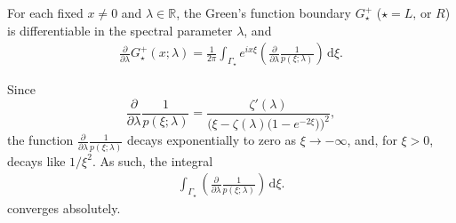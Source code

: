 \documentclass[../dissertation]{subfiles}
\begin{document}
\begin{prop}\label{prop2:ldervG}
	For each fixed $x\ne 0$ and $\lambda \in \mathbb R$, the Green's function 
	boundary $G_\star^+$ ($\star = L \text{, or } R$) is dif{}ferentiable in 
	the spectral parameter $\lambda$, and 
	\begin{align*}
		\frac{\partial}{\partial \lambda} G_\star^+(x; \lambda)
			= \frac{1}{2\pi} 
				\int_{{\Gamma_\star}} e^{ix\xi} 
					\left(
						\frac{\partial}{\partial \lambda} \frac{1}{p(\xi; \lambda)}
					\right)
				\, \mathrm{d}\xi.
	\end{align*}
\end{prop}
\begin{rmk}
	Since
	\[
		\frac{\partial}{\partial \lambda} \frac{1}{p(\xi; \lambda)}
			= 
				\frac{\zeta'(\lambda)}
				{\Big(\xi - \zeta(\lambda)\big(1-e^{-2\xi}\big)\Big)^2},
	\]
	the function $\frac{\partial}{\partial \lambda} \frac{1}{p(\xi; \lambda)}$ 
	decays exponentially to zero as $\xi\to -\infty$, and, for $\xi > 0$, decays
	like $1/\xi^2$. As such, the integral
	\begin{align*}
		\int_{\Gamma_\star}
			\left(
				\frac{\partial}{\partial \lambda} \frac{1}{p(\xi; \lambda)}
			\right)
		\, \mathrm{d}\xi.
	\end{align*}
	converges absolutely.
\end{rmk}
\end{document}
